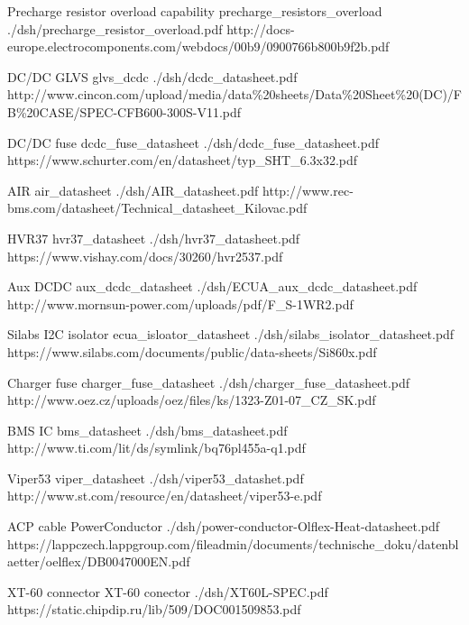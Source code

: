 	{Precharge resistor overload capability}
	{precharge_resistors_overload}
	{./dsh/precharge_resistor_overload.pdf}
	{http://docs-europe.electrocomponents.com/webdocs/00b9/0900766b800b9f2b.pdf}

	{DC/DC GLVS}
	{glvs_dcdc}
	{./dsh/dcdc_datasheet.pdf}
	{http://www.cincon.com/upload/media/data\%20sheets/Data\%20Sheet\%20(DC)/FB\%20CASE/SPEC-CFB600-300S-V11.pdf}

	{DC/DC fuse}
	{dcdc_fuse_datasheet}
	{./dsh/dcdc_fuse_datasheet.pdf}
	{https://www.schurter.com/en/datasheet/typ_SHT_6.3x32.pdf}

	{AIR}
	{air_datasheet}
	{./dsh/AIR_datasheet.pdf}
	{http://www.rec-bms.com/datasheet/Technical_datasheet_Kilovac.pdf}

	{HVR37}
	{hvr37_datasheet}
	{./dsh/hvr37_datasheet.pdf}
	{https://www.vishay.com/docs/30260/hvr2537.pdf}

	{Aux DCDC}
	{aux_dcdc_datasheet}
	{./dsh/ECUA_aux_dcdc_datasheet.pdf}
	{http://www.mornsun-power.com/uploads/pdf/F_S-1WR2.pdf}

	{Silabs I2C isolator}
	{ecua_isloator_datasheet}
	{./dsh/silabs_isolator_datasheet.pdf}
	{https://www.silabs.com/documents/public/data-sheets/Si860x.pdf}

	{Charger fuse}
	{charger_fuse_datasheet}
	{./dsh/charger_fuse_datasheet.pdf}
	{http://www.oez.cz/uploads/oez/files/ks/1323-Z01-07_CZ_SK.pdf}

	{BMS IC}
	{bms_datasheet}
	{./dsh/bms_datasheet.pdf}
	{http://www.ti.com/lit/ds/symlink/bq76pl455a-q1.pdf}

	{Viper53}
	{viper_datasheet}
	{./dsh/viper53_datashet.pdf}
	{http://www.st.com/resource/en/datasheet/viper53-e.pdf}

	{ACP cable}
	{PowerConductor}
	{./dsh/power-conductor-Olflex-Heat-datasheet.pdf}
	{https://lappczech.lappgroup.com/fileadmin/documents/technische_doku/datenblaetter/oelflex/DB0047000EN.pdf}

	{XT-60 connector}
	{XT-60 conector}
	{./dsh/XT60L-SPEC.pdf}
	{https://static.chipdip.ru/lib/509/DOC001509853.pdf}
